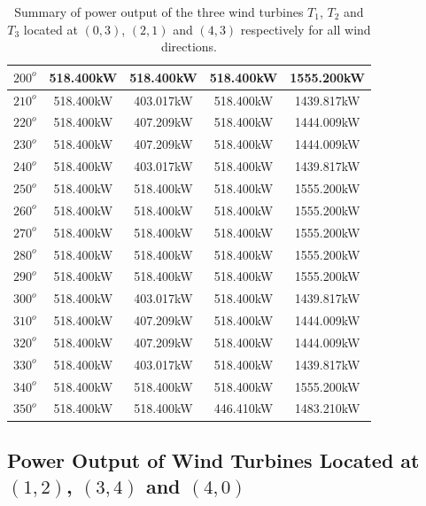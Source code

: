 \begin{table}[H]
\begin{tabular}{|c|c|c|c|c|}
	     \hline
	     $200^{o}$ & 518.400kW & 518.400kW & 518.400kW & 1555.200kW \\
	     \hline
	     $210^{o}$ & 518.400kW & 403.017kW & 518.400kW & 1439.817kW \\
	     \hline
	     $220^{o}$ & 518.400kW & 407.209kW & 518.400kW & 1444.009kW \\
	     \hline
	     $230^{o}$ & 518.400kW & 407.209kW & 518.400kW & 1444.009kW \\
	     \hline
	     $240^{o}$ & 518.400kW & 403.017kW & 518.400kW & 1439.817kW \\
	     \hline
	     $250^{o}$ & 518.400kW & 518.400kW & 518.400kW & 1555.200kW \\
	     \hline
	     $260^{o}$ & 518.400kW & 518.400kW & 518.400kW & 1555.200kW \\
	     \hline
	     $270^{o}$ & 518.400kW & 518.400kW & 518.400kW & 1555.200kW \\
	     \hline
	     $280^{o}$ & 518.400kW & 518.400kW & 518.400kW & 1555.200kW \\
	     \hline
	     $290^{o}$ & 518.400kW & 518.400kW & 518.400kW & 1555.200kW \\
	     \hline
	     $300^{o}$ & 518.400kW & 403.017kW & 518.400kW & 1439.817kW \\
	     \hline
	     $310^{o}$ & 518.400kW & 407.209kW & 518.400kW & 1444.009kW \\
	     \hline
	     $320^{o}$ & 518.400kW & 407.209kW & 518.400kW & 1444.009kW \\
	     \hline
	     $330^{o}$ & 518.400kW & 403.017kW & 518.400kW & 1439.817kW \\
	     \hline
	     $340^{o}$ & 518.400kW & 518.400kW & 518.400kW & 1555.200kW \\
	     \hline
	     $350^{o}$ & 518.400kW & 518.400kW & 446.410kW & 1483.210kW \\
	     \hline
	    \end{tabular}
	    \caption{Summary of power output of the three wind turbines $T_1$, $T_2$ and $T_3$ located at $(0,3)$, $(2,1)$ and $(4,3)$ respectively for all wind directions.}
	    \label{summaryRandom2-3b}
	\end{table}
	\doublespacing
	
	
\subsection{Power Output of Wind Turbines Located at $(1,2)$, $(3,4)$ and $(4,0)$}
	
